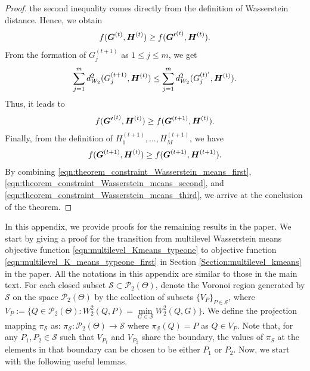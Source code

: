 \begin{proof}
the second inequality comes directly from the definition of Wasserstein distance. Hence, we obtain
\begin{eqnarray}
f(\boldsymbol{G}^{(t)},\boldsymbol{H}^{(t)})\geq f(\boldsymbol{G'}^{(t)},\boldsymbol{H}^{(t)}). \label{eqn:theorem_constraint_Wasserstein_means_first}
\end{eqnarray}
From the formation of $G_{j}^{(t+1)}$ as $1 \leq j \leq m$, we get
\begin{eqnarray}
\sum \limits_{j=1}^{m}{d_{W_{2}}^{2}(G_{j}^{(t+1)},\boldsymbol{H}^{(t)})} \leq \sum \limits_{j=1}^{m}{d_{W_{2}}^{2}(G_{j}^{(t)'},\boldsymbol{H}^{(t)})}. \nonumber
\end{eqnarray}
Thus, it leads to 
\begin{eqnarray}
f(\boldsymbol{G'}^{(t)},\boldsymbol{H}^{(t)}) \geq f(\boldsymbol{G}^{(t+1)},\boldsymbol{H}^{(t)}). \label{eqn:theorem_constraint_Wasserstein_means_second}
\end{eqnarray}
Finally, from the definition of $H_{1}^{(t+1)},\ldots,H_{M}^{(t+1)}$, we have
\begin{eqnarray}
f(\boldsymbol{G}^{(t+1)},\boldsymbol{H}^{(t)}) \geq f(\boldsymbol{G}^{(t+1)},\boldsymbol{H}^{(t+1)}). \label{eqn:theorem_constraint_Wasserstein_means_third}
\end{eqnarray}
By combining \eqref{eqn:theorem_constraint_Wasserstein_means_first}, \eqref{eqn:theorem_constraint_Wasserstein_means_second}, and \eqref{eqn:theorem_constraint_Wasserstein_means_third},  we arrive at the conclusion of the theorem.
\end{proof}

In this appendix, we provide proofs for the remaining results in the paper. 
We start by giving a proof for the transition 
from multilevel Wasserstein means objective function \eqref{eqn:multilevel_Kmeans_typeone} to objective function 
\eqref{eqn:multilevel_K_means_typeone_first} in Section \ref{Section:multilevel_kmeans} in the paper. 
All the notations in this appendix are similar to those in the main text. 
For each closed subset $\mathcal{S} \subset \mathcal{P}_{2}(\Theta)$, 
denote the Voronoi region generated by $\mathcal{S}$ on the space 
$\mathcal{P}_{2}(\Theta)$ by the collection of subsets
$\{ V_P \}_{P \in \mathcal{S}}$, 
where $V_P := \{Q \in \mathcal{P}_{2}(\Theta) : W_{2}^{2}(Q,P) = 
\mathop {\min }\limits_{G \in \mathcal{S}} W_{2}^{2}(Q,G)\}$. We define the projection mapping $\pi _\mathcal{S}$ as: $\pi _{\mathcal{S}} :\mathcal{P}_{2}(\Theta)  \to \mathcal{S}$ 
where $\pi _{\mathcal{S}} (Q) = P$ as $Q \in V_{P}$. Note that, for any $P_{1}, P_{2} \in \mathcal{S}$ such that $V_{P_{1}}$ and $V_{P_{2}}$ share the boundary, the values of $\pi_{S}$ at the elements in that boundary can be chosen to be either $P_{1}$ or $P_{2}$. Now, we start with the following useful lemmas.

